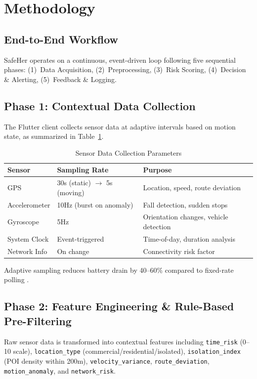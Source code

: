 \section{Methodology}

\subsection{End-to-End Workflow}
SafeHer operates on a continuous, event-driven loop following five sequential phases: (1)~Data Acquisition, (2)~Preprocessing, (3)~Risk Scoring, (4)~Decision \& Alerting, (5)~Feedback \& Logging.

\subsection{Phase 1: Contextual Data Collection}
The Flutter client collects sensor data at adaptive intervals based on motion state, as summarized in Table~\ref{tab:sensors}.

\begin{table}[htbp]
\caption{Sensor Data Collection Parameters}
\label{tab:sensors}
\centering
\scriptsize
\begin{tabularx}{\columnwidth}{|p{1.2cm}|p{1.8cm}|X|}
\hline
\textbf{Sensor} & \textbf{Sampling Rate} & \textbf{Purpose} \\
\hline
GPS & 30s (static) $\to$ 5s (moving) & Location, speed, route deviation \\
\hline
Accelerometer & 10Hz (burst on anomaly) & Fall detection, sudden stops \\
\hline
Gyroscope & 5Hz & Orientation changes, vehicle detection \\
\hline
System Clock & Event-triggered & Time-of-day, duration analysis \\
\hline
Network Info & On change & Connectivity risk factor \\
\hline
\end{tabularx}
\end{table}

Adaptive sampling reduces battery drain by 40--60\% compared to fixed-rate polling \cite{apple2024}.

\subsection{Phase 2: Feature Engineering \& Rule-Based Pre-Filtering}
Raw sensor data is transformed into contextual features including \texttt{time\_risk} (0--10 scale), \texttt{location\_type} (commercial/residential/isolated), \texttt{isolation\_index} (POI density within 200m), \texttt{velocity\_variance}, \texttt{route\_deviation}, \texttt{motion\_anomaly}, and \texttt{network\_risk}.

